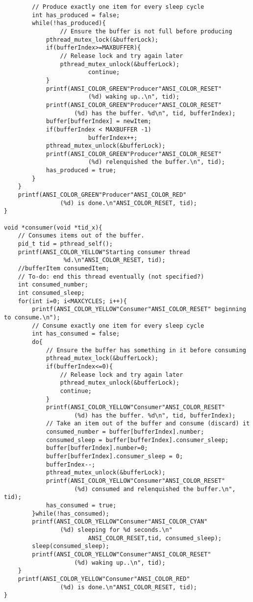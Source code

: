 \documentclass[journal,10pt,onecolumn,compsoc,letterpaper,draftclsnofoot,table,xcdraw]{IEEEtran} \usepackage[margin=0.75in]{geometry}
\begin{document}
\begin{verbatim}
		// Produce exactly one item for every sleep cycle
		int has_produced = false;
		while(!has_produced){
		        // Ensure the buffer is not full before producing
			pthread_mutex_lock(&bufferLock);
			if(bufferIndex>=MAXBUFFER){
				// Release lock and try again later
				pthread_mutex_unlock(&bufferLock);
	                	continue;
			}
			printf(ANSI_COLOR_GREEN"Producer"ANSI_COLOR_RESET" 
            			(%d) waking up..\n", tid);
			printf(ANSI_COLOR_GREEN"Producer"ANSI_COLOR_RESET" 
            		(%d) has the buffer. %d\n", tid, bufferIndex);
			buffer[bufferIndex] = newItem;
			if(bufferIndex < MAXBUFFER -1)
        	        	bufferIndex++;
			pthread_mutex_unlock(&bufferLock);
			printf(ANSI_COLOR_GREEN"Producer"ANSI_COLOR_RESET" 
            			(%d) relenquished the buffer.\n", tid);
			has_produced = true;
		}
	}
	printf(ANSI_COLOR_GREEN"Producer"ANSI_COLOR_RED" 
    			(%d) is done.\n"ANSI_COLOR_RESET, tid);
}

void *consumer(void *tid_x){
	// Consumes items out of the buffer.
	pid_t tid = pthread_self();
    printf(ANSI_COLOR_YELLOW"Starting consumer thread
				 %d.\n"ANSI_COLOR_RESET, tid);
	//bufferItem consumedItem;
	// To-do: end this thread eventually (not specified?)
	int consumed_number;
    int consumed_sleep;
    for(int i=0; i<MAXCYCLES; i++){
        printf(ANSI_COLOR_YELLOW"Consumer"ANSI_COLOR_RESET" beginning to consume.\n");
		// Consume exactly one item for every sleep cycle
		int has_consumed = false;
		do{
			// Ensure the buffer has something in it before consuming
			pthread_mutex_lock(&bufferLock);
			if(bufferIndex<=0){
				// Release lock and try again later
				pthread_mutex_unlock(&bufferLock);
				continue;
			}
			printf(ANSI_COLOR_YELLOW"Consumer"ANSI_COLOR_RESET" 
            		(%d) has the buffer. %d\n", tid, bufferIndex);
			// Take an item out of the buffer and consume (discard) it
			consumed_number = buffer[bufferIndex].number;
            consumed_sleep = buffer[bufferIndex].consumer_sleep;
			buffer[bufferIndex].number=0;
			buffer[bufferIndex].consumer_sleep = 0;
			bufferIndex--;
			pthread_mutex_unlock(&bufferLock);
			printf(ANSI_COLOR_YELLOW"Consumer"ANSI_COLOR_RESET" 
            		(%d) consumed and relenquished the buffer.\n", tid);
			has_consumed = true;
		}while(!has_consumed);
		printf(ANSI_COLOR_YELLOW"Consumer"ANSI_COLOR_CYAN" 
        		(%d) sleeping for %d seconds.\n"
                		ANSI_COLOR_RESET,tid, consumed_sleep);
		sleep(consumed_sleep);
		printf(ANSI_COLOR_YELLOW"Consumer"ANSI_COLOR_RESET"
        			(%d) waking up..\n", tid);
	}
	printf(ANSI_COLOR_YELLOW"Consumer"ANSI_COLOR_RED" 
    			(%d) is done.\n"ANSI_COLOR_RESET, tid);
}


\end{verbatim}
\end{document}
